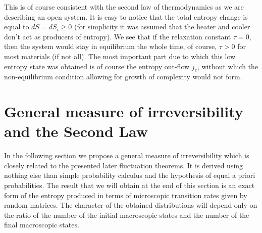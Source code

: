 \documentclass[a4paper,12pt]{article}
\begin{document}
This is of course consistent with the second law of thermodynamics as we are describing an open system.
It is easy to notice that the total entropy change is equal to $dS=dS_i \geq 0$ (for simplicity it was assumed that the heater and cooler don't act as producers of entropy).
We see that if the relaxation constant $\tau = 0$, then the system would stay in equilibrium the whole time, of course, $\tau > 0$ for most materials (if not all). The most important part due to which this low entropy state was obtained is of course the entropy out-flow $j_e$, without which the non-equilibrium condition allowing for growth of complexity would not form.

\section{General measure of irreversibility and the Second Law}
\label{IrreversibilityMeasureSection}
In the following section we propose a general measure of irreversibility which is closely related to the presented later fluctuation theorems. It is derived using nothing else than simple probability calculus and the hypothesis of equal a priori probabilities.
The result that we will obtain at the end of this section is an exact form of the entropy produced in terms of microscopic transition rates given by random matrices. The character of the obtained distributions will depend only on the ratio of the number of the initial macroscopic states and the number of the final macroscopic states.
\end{document}

